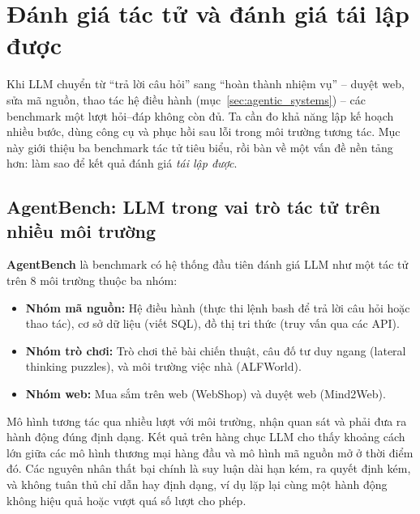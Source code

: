 
\section{Đánh giá tác tử và đánh giá tái lập được}
\label{sec:agent_evaluation}

Khi LLM chuyển từ “trả lời câu hỏi” sang “hoàn thành nhiệm vụ” -- duyệt web, sửa mã nguồn, thao tác hệ điều hành (mục~\ref{sec:agentic_systems}) -- các benchmark một lượt hỏi--đáp không còn đủ. Ta cần đo khả năng lập kế hoạch nhiều bước, dùng công cụ và phục hồi sau lỗi trong môi trường tương tác. Mục này giới thiệu ba benchmark tác tử tiêu biểu, rồi bàn về một vấn đề nền tảng hơn: làm sao để kết quả đánh giá \emph{tái lập được}.

\subsection{AgentBench: LLM trong vai trò tác tử trên nhiều môi trường}
\label{ssec:agentbench}
\textbf{AgentBench} \cite{liu2024agentbench} là benchmark có hệ thống đầu tiên đánh giá LLM như một tác tử trên 8 môi trường thuộc ba nhóm:
\begin{itemize}
	\item \textbf{Nhóm mã nguồn:} Hệ điều hành (thực thi lệnh bash để trả lời câu hỏi hoặc thao tác), cơ sở dữ liệu (viết SQL), đồ thị tri thức (truy vấn qua các API).
	\item \textbf{Nhóm trò chơi:} Trò chơi thẻ bài chiến thuật, câu đố tư duy ngang (lateral thinking puzzles), và môi trường việc nhà (ALFWorld).
	\item \textbf{Nhóm web:} Mua sắm trên web (WebShop) và duyệt web (Mind2Web).
\end{itemize}
Mô hình tương tác qua nhiều lượt với môi trường, nhận quan sát và phải đưa ra hành động đúng định dạng. Kết quả trên hàng chục LLM cho thấy khoảng cách lớn giữa các mô hình thương mại hàng đầu và mô hình mã nguồn mở ở thời điểm đó. Các nguyên nhân thất bại chính là suy luận dài hạn kém, ra quyết định kém, và không tuân thủ chỉ dẫn hay định dạng, ví dụ lặp lại cùng một hành động không hiệu quả hoặc vượt quá số lượt cho phép.


